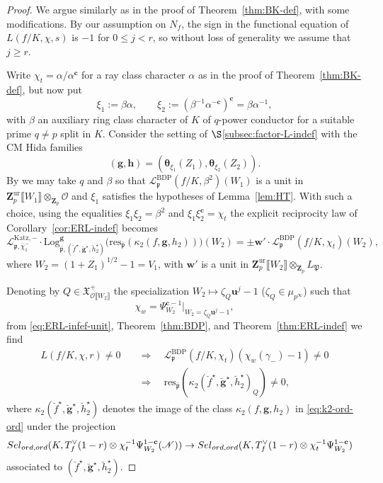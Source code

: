 \documentclass[10pt,letterpaper]{amsart}
\theoremstyle{plain}
\theoremstyle{definition}
\theoremstyle{definition}
\theoremstyle{plain}
\theoremstyle{plain}
\theoremstyle{plain}
\theoremstyle{remark}
\numberwithin{equation}{section}
\newcommand{\cc}{\mathbf{c}}
\newcommand{\ch}{\xi}
\newcommand{\Sel}{Sel}
\newcommand{\pp}{\mathfrak{p}}
\newcommand{\ppbar}{\bar{\mathfrak{p}}}
\newcommand{\ord}{{{\rm ord},{\rm ord}}}
\DeclareMathOperator{\ur}{\mathrm{ur}}
\DeclareMathOperator{\BDP}{BDP} %
\def\cO{\mathcal O}
\newcommand{\Z}{\mathbf{Z}}
\def\Sel{{\rm Sel}}
\newcommand{\dBr}[1]{\llbracket{#1}\rrbracket}
\newcommand{\bfg}{{\boldsymbol{g}}}
\newcommand{\bfh}{{\boldsymbol{h}}}
\begin{document}
\begin{proof}
We argue similarly as in the proof of Theorem~\ref{thm:BK-def}, with some modifications. By our assumption on $N_f$, the sign in the functional equation of $L(f/K,\chi,s)$ is $-1$ for $0\leq j<r$, so without loss of generality we assume that %
$j\geq r$.

Write $\chi_t=\alpha/\alpha^\cc$ for a ray class character $\alpha$ as in the proof of Theorem~\ref{thm:BK-def}, but now put
\begin{equation}\label{eq:xi-i}
\ch_1:=\beta\alpha,\quad\quad\ch_2:=(\beta^{-1}\alpha^{-\cc})^\cc=\beta\alpha^{-1},
\end{equation}
with $\beta$ an auxiliary ring class character of $K$ of $q$-power conductor for a suitable prime $q\neq p$ split in $K$. Consider the setting of $\S$\ref{subsec:factor-L-indef} with the CM Hida families
\[
(\bfg,\bfh)=(\boldsymbol{\theta}_{\ch_1}(Z_1),\boldsymbol{\theta}_{\ch_2}(Z_2)).
\]
By \cite[Thm.~C]{ChHs1} we may take $q$ and $\beta$ so that $\mathscr{L}_\pp^{\BDP}(f/K,\beta^2)(W_1)$ is a unit in $\Z_p^{\ur}\dBr{W_1}\otimes_{\Z_p}\cO$ and $\xi_1$ satisfies the hypotheses of Lemma~\ref{lem:HT}. With such a choice, using the equalities $\xi_1\xi_2=\beta^2$ and $\xi_1\xi_2^\cc=\chi_t$ the explicit reciprocity law of Corollary~\ref{cor:ERL-indef} becomes
\begin{equation}\label{eq:ERL-infef-unit}
\mathcal{L}_{\pp,\bar{\chi}_1^-}^{{\mathrm{Katz}},-}\cdot{\mathrm{Log}}^\bfg_{\ppbar,(\breve{f}^\star,\breve{\bfg}^\star,\breve{h}_2^\star)}\bigl({\mathrm{res}}_{\ppbar}(\kappa_2(f,\bfg,h_2))\bigr)(W_2)
=\pm\mathbf{w}'\cdot\mathscr{L}_\pp^{\BDP}(f/K,\chi_t)(W_2),
\end{equation}
where $W_2=(1+Z_1)^{1/2}-1=V_1$, with $\mathbf{w}'$ is a unit in $\Z_p^{\ur}\dBr{W_2}\otimes_{\Z_p}L_\mathfrak{P}$.

Denoting by $Q\in\mathfrak{X}_{\cO\dBr{W_2}}^{+}$ the specialization $W_2\mapsto\zeta_Q\mathbf{u}^{j}-1$  ($\zeta_Q\in\mu_{p^\infty}$) such that
\[
\chi_w=\Psi_{W_2}^{\cc-1}\vert_{W_2=\zeta_Q\mathbf{u}^j-1},
\]
from \eqref{eq:ERL-infef-unit}, Theorem~\ref{thm:BDP}, and Theorem~\ref{thm:ERL-indef} we find
\begin{equation}\label{eq:L-implies-indef}
\begin{aligned}
L(f/K,\chi,r)\neq 0\quad&\Longrightarrow\quad\mathscr{L}_\pp^{\BDP}(f/K,\chi_t)(\chi_w(\gamma_-)-1)\neq 0\\
&\Longrightarrow\quad{\mathrm{res}}_{\ppbar}(\kappa_2(\breve{f}^\star,\breve{\bfg}^\star,\breve{h}_2^\star)_Q)\neq 0,
\end{aligned}
\end{equation}
where $\kappa_2(\breve{f}^\star,\breve{\bfg}^\star,\breve{h}_2^\star)$
denotes the image of the class $\kappa_2(f,\bfg,h_2)$ in \eqref{eq:k2-ord-ord} under the projection
\begin{align*}
\Sel_{\ord}(K,T_f^{\vee}(1-r)\otimes\chi_t^{-1}\Psi_{W_2}^{1-\cc}(\mathscr{N}))&\rightarrow\Sel_{\ord}(K,T_f^{\vee}(1-r)\otimes\chi_t^{-1}\Psi_{W_2}^{1-\cc})
\end{align*}
associated to $(\breve{f}^\star,\breve{\bfg}^\star,\breve{h}_2^\star)$. 


\end{proof}
\end{document}
